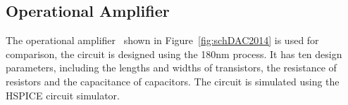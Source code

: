 
\subsection{Operational Amplifier}



The operational amplifier~\cite{wang2014enabling} shown in Figure~\ref{fig:schDAC2014} is used for
comparison, the circuit is designed using the 180nm process. It has ten design
parameters, including the lengths and widths of transistors, the resistance of
resistors and the capacitance of capacitors. The circuit is simulated using the
HSPICE circuit simulator.

